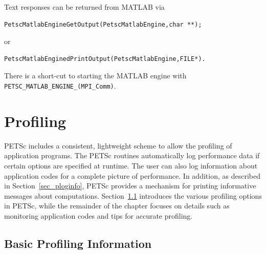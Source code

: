 Text responses can be returned from MATLAB via
\begin{lstlisting}
PetscMatlabEngineGetOutput(PetscMatlabEngine,char **);
\end{lstlisting}
or
\begin{lstlisting}
PetscMatlabEnginedPrintOutput(PetscMatlabEngine,FILE*).
\end{lstlisting}
There is a short-cut to starting the MATLAB engine
with \lstinline{PETSC_MATLAB_ENGINE_(MPI_Comm)}.

\cleardoublepage
\chapter{Profiling}
\label{ch_profiling} 

PETSc includes a consistent, lightweight scheme to allow the profiling
of application programs.  The PETSc routines automatically log
performance data if certain options are specified at runtime.  The
user can also log information about application codes for a complete
picture of performance.  In addition, as described in
Section~\ref{sec_ploginfo}, PETSc provides a mechanism for printing
informative messages about computations.  Section~\ref{sec_profbasic}
introduces the various profiling options in PETSc, while the
remainder of the chapter focuses on details such as monitoring
application codes and tips for accurate profiling.

\section{Basic Profiling Information}
\label{sec_profbasic}
  

